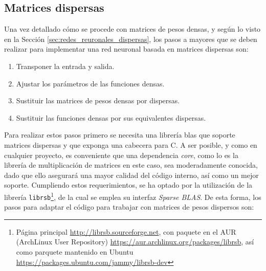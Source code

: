 \subsection{Matrices dispersas}
\label{ssec_gdin_matrices_dispersas}
Una vez detallado cómo se procede con matrices de pesos densas, y según lo visto en la Sección \ref{sec:redes_reuronales_dispersas}, los pasos a mayores que se deben realizar para implementar una red neuronal basada en matrices dispersas son:

\begin{enumerate}
    \item Transponer la entrada y salida.
    \item Ajustar los parámetros de las funciones densas.
    \item Sustituir las matrices de pesos densas por dispersas.
    \item Sustituir las funciones densas por sus equivalentes dispersas.
\end{enumerate}

Para realizar estos pasos primero se necesita una librería \acrshort{blas} que soporte matrices dispersas y que exponga una cabecera para C. A ser posible, y como en cualquier proyecto, es conveniente que una dependencia \textit{core}, como lo es la librería de multiplicación de matrices en este caso, sea moderadamente conocida, dado que ello asegurará una mayor calidad del código interno, así como un mejor soporte. Cumpliendo estos requerimientos, se ha optado por la utilización de la librería \texttt{librsb}\footnote{Página principal \url{http://librsb.sourceforge.net}, con paquete en el AUR (ArchLinux User Repository) \url{https://aur.archlinux.org/packages/librsb}, así como parquete mantenido en Ubuntu \url{https://packages.ubuntu.com/jammy/librsb-dev}}, de la cual se emplea su interfaz \textit{Sparse BLAS}. De esta forma, los pasos para adaptar el código para trabajar con matrices de pesos dispersos son:

